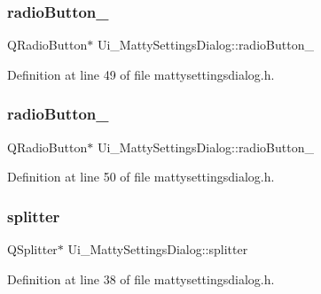 \subsubsection{\texorpdfstring{radio\+Button\+\_}{radioButton\_2}}
{\footnotesize\ttfamily Q\+Radio\+Button$\ast$ Ui\+\_\+\+Matty\+Settings\+Dialog\+::radio\+Button\+\_}



Definition at line 49 of file mattysettingsdialog.\+h.

\hypertarget{classUi__MattySettingsDialog_aa1af85cd639b28ae0557d1651203bff9}{}\label{classUi__MattySettingsDialog_aa1af85cd639b28ae0557d1651203bff9} 
\subsubsection{\texorpdfstring{radio\+Button\+\_}{radioButton\_3}}
{\footnotesize\ttfamily Q\+Radio\+Button$\ast$ Ui\+\_\+\+Matty\+Settings\+Dialog\+::radio\+Button\+\_}



Definition at line 50 of file mattysettingsdialog.\+h.

\hypertarget{classUi__MattySettingsDialog_ac1f89fadbbf9a2a2c6a1b29b793966b6}{}\label{classUi__MattySettingsDialog_ac1f89fadbbf9a2a2c6a1b29b793966b6} 
\subsubsection{\texorpdfstring{splitter}{splitter}}
{\footnotesize\ttfamily Q\+Splitter$\ast$ Ui\+\_\+\+Matty\+Settings\+Dialog\+::splitter}



Definition at line 38 of file mattysettingsdialog.\+h.

\hypertarget{classUi__MattySettingsDialog_a8a2a4dbb6feae0c8d691241a8ab6ec5f}{}\label{classUi__MattySettingsDialog_a8a2a4dbb6feae0c8d691241a8ab6ec5f} 
